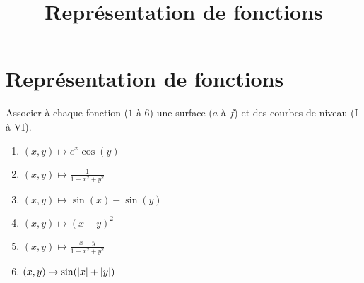 \documentclass{tp_um}
\title{\Large \sffamily\bfseries Représentation de fonctions}
\begin{document}
\maketitle

\section{Représentation de fonctions}




\exo{} Associer à chaque fonction ($1$ à $6$) une surface ($a$ à $f$) et des courbes de niveau (I à VI).
\begin{multicols}{3}
\begin{enumerate}
    \item $(x,y) \mapsto e^x \cos(y)$
	\item $(x,y) \mapsto \frac{1}{1+x^2+y^2}$
	\item $(x,y) \mapsto \sin(x) - \sin(y)$
	\item $(x,y) \mapsto (x-y)^2$
	\item $(x,y) \mapsto \frac{x-y}{1+x^2+y^2}$
	\item $(x,y) \mapsto \sin(\left\lvert x\right\rvert + \left\lvert y\right\rvert)$
\end{enumerate}
\end{multicols}
\end{document}
